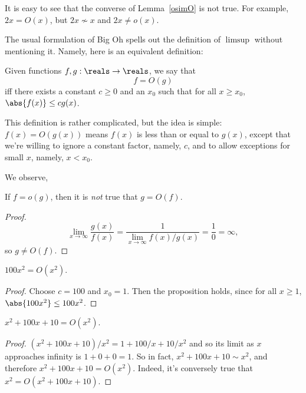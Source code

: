 It is easy to see that the converse of Lemma~\ref{osimO} is not true.  For
example, $2x = O(x)$, but $2x \not\sim x$ and $2x \neq o(x)$.

The usual formulation of Big Oh spells out the definition of $\limsup$
without mentioning it.  Namely, here is an equivalent definition:
\begin{definition}
Given functions $f, g : \reals \to \reals$, we say that
\[
f = O(g)
\]
iff there exists a constant $c \geq 0$ and an $x_0$ such that for all $x \geq
x_0$, $\abs{f(x)} \leq c g(x)$.
\end{definition}

This definition is rather complicated, but the idea is simple: $f(x) =
O(g(x))$ means $f(x)$ is less than or equal to $g(x)$, except that we're
willing to ignore a constant factor, namely, $c$, and to allow exceptions for
small $x$, namely, $x < x_0$.

We observe,
\begin{lemma}
If $f = o(g)$, then it is \emph{not} true that $g = O(f)$.
\end{lemma}
\begin{proof}
\[
\lim_{x \rightarrow \infty} \frac{g(x)}{f(x)} =
 \frac{1}{\lim_{x \rightarrow \infty} f(x)/g(x)} =
 \frac{1}{0} = \infty,
\]
so $g \neq O(f)$.

\iffalse
We will prove the equivalent contrapositive, i.e., that
if $g=O(f)$ then it is not true that $f=o(g)$.  If
$g=O(f)$ then there 
exists a constant $c \geq 0$ and an $x_0$ such that for all $x \geq
x_0$, $\abs{g(x)} \leq c f(x)$.
Then for all $x \geq x_0$, we have that $f(x)/|g(x)| = f(x)/g(x) >c>0$
(the first equality uses the nonnegativity of $g$).
Thus $\lim_{x \rightarrow \infty} f(x)/g(x) >0$ and so it is not true that
$f=o(g)$.
\fi

\end{proof}

\begin{proposition}
$100x^2 = O(x^2)$.
\end{proposition}

\begin{proof}
Choose $c = 100$ and $x_0 = 1$.  Then the proposition holds, since for all
$x \geq 1$, $\abs{100x^2} \leq 100 x^2$.
\end{proof}

\begin{proposition}\label{x2O}
$x^2 + 100x + 10 = O(x^2)$.
\end{proposition}

\begin{proof}
$(x^2 + 100x + 10)/x^2 = 1 + 100/x + 10/x^2$ and so its limit as $x$
approaches infinity is $1 + 0 + 0 = 1$.  So in fact, $x^2 + 100x + 10 \sim
x^2$, and therefore $x^2 + 100x + 10 = O(x^2)$.  Indeed, it's conversely
true that $x^2= O(x^2 + 100x + 10)$.
\end{proof}

